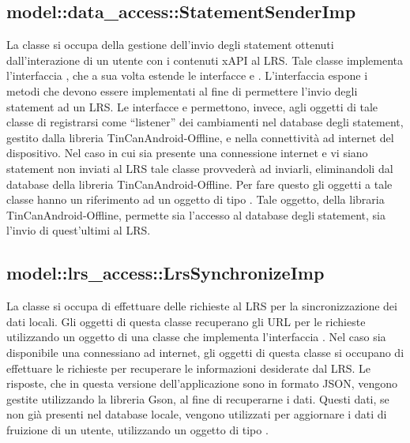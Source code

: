 \documentclass[../Tesi.tex]{subfiles}
\begin{document}
		\subsection{model::data\_access::StatementSenderImp}
		La classe  si occupa della gestione dell'invio degli statement ottenuti dall'interazione di un utente con i contenuti xAPI al LRS. Tale classe implementa l'interfaccia , che a sua volta estende le interfacce  e . L'interfaccia  espone i metodi che devono essere implementati al fine di permettere l'invio degli statement ad un LRS. Le interfacce  e  permettono, invece, agli oggetti di tale classe di registrarsi come ``listener'' dei cambiamenti nel database degli statement, gestito dalla libreria TinCanAndroid-Offline, e nella connettività ad internet del dispositivo. Nel caso in cui sia presente una connessione internet e vi siano statement non inviati al LRS tale classe provvederà ad inviarli, eliminandoli dal database della libreria TinCanAndroid-Offline. Per fare questo gli oggetti a tale classe hanno un riferimento ad un oggetto di tipo . Tale oggetto, della libraria TinCanAndroid-Offline, permette sia l'accesso al database degli statement, sia l'invio di quest'ultimi al LRS.

		\subsection{model::lrs\_access::LrsSynchronizeImp}
		La classe  si occupa di effettuare delle richieste al LRS per la sincronizzazione dei dati locali. Gli oggetti di questa classe recuperano gli URL per le richieste utilizzando un oggetto di una classe che implementa l'interfaccia . Nel caso sia disponibile una connessiano ad internet, gli oggetti di questa classe si occupano di effettuare le richieste per recuperare le informazioni desiderate dal LRS. Le risposte, che in questa versione dell'applicazione sono in formato JSON, vengono gestite utilizzando la libreria Gson, al fine di recuperarne i dati. Questi dati, se non già presenti nel database locale, vengono utilizzati per aggiornare i dati di fruizione di un utente, utilizzando un oggetto di tipo . 
\end{document}
